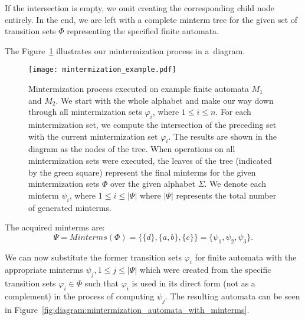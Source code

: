 If the intersection is empty, we omit creating the corresponding child node entirely. In the end, we are left with a complete minterm tree for the given set of transition sets $\Phi$ representing the specified finite automata.

The Figure~\ref{fig:diagram:mintermization_example} illustrates our mintermization process in a~diagram.

\begin{figure}[ht]
	\centering
	\texttt{[image: mintermization\_example.pdf]}
	\caption{Mintermization process executed on example finite automata $M_1$ and $M_2$. We start with the whole alphabet and make our way down through all mintermization sets $\varphi_i$, where $1 \leq i \leq n$. For each mintermization set, we compute the intersection of the preceding set with the current mintermization set $\varphi_i$. The results are shown in the diagram as the nodes of the tree. When operations on all mintermization sets were executed, the leaves of the tree (indicated by the green square) represent the final minterms for the given mintermization sets $\Phi$ over the given alphabet $\Sigma$. We denote each minterm $\psi_i$, where $1 \leq i \leq |\Psi|$ where $|\Psi|$ represents the total number of generated minterms.}
	\label{fig:diagram:mintermization_example}
\end{figure}

The acquired minterms are:
$$ \Psi = Minterms(\Phi) = \{ \{d\}, \{a, b\}, \{c\} \} = \{ \psi_1, \psi_2, \psi_3 \} \text{.}$$

We can now substitute the former transition sets $\varphi_i$ for finite automata with the appropriate minterms $\psi_j, 1 \leq j \leq |\Psi|$ which were created from the specific transition sets $\varphi_i \in \Phi$ such that $\varphi_i$ is used in its direct form (not as a complement) in the process of computing $\psi_j$. The resulting automata can be seen in Figure~\ref{fig:diagram:mintermization_automata_with_minterms}.

